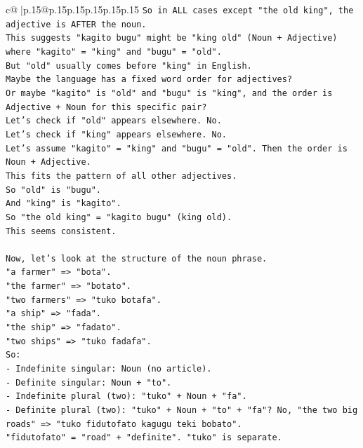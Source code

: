 \documentclass{article}
\begin{document}
{\begin{supertabular}{c@{$\;$}|p{.15\linewidth}@{}p{.15\linewidth}p{.15\linewidth}p{.15\linewidth}p{.15\linewidth}p{.15\linewidth}}
{{{\texttt{So in ALL cases except "the old king", the adjective is AFTER the noun.} \\
\texttt{This suggests "kagito bugu" might be "king old" (Noun + Adjective) where "kagito" = "king" and "bugu" = "old".} \\
\texttt{But "old" usually comes before "king" in English.} \\
\texttt{Maybe the language has a fixed word order for adjectives?} \\
\texttt{Or maybe "kagito" is "old" and "bugu" is "king", and the order is Adjective + Noun for this specific pair?} \\
\texttt{Let's check if "old" appears elsewhere. No.} \\
\texttt{Let's check if "king" appears elsewhere. No.} \\
\texttt{Let's assume "kagito" = "king" and "bugu" = "old". Then the order is Noun + Adjective.} \\
\texttt{This fits the pattern of all other adjectives.} \\
\texttt{So "old" is "bugu".} \\
\texttt{And "king" is "kagito".} \\
\texttt{So "the old king" = "kagito bugu" (king old).} \\
\texttt{This seems consistent.} \\
\\ 
\texttt{Now, let's look at the structure of the noun phrase.} \\
\texttt{"a farmer" => "bota".} \\
\texttt{"the farmer" => "botato".} \\
\texttt{"two farmers" => "tuko botafa".} \\
\texttt{"a ship" => "fada".} \\
\texttt{"the ship" => "fadato".} \\
\texttt{"two ships" => "tuko fadafa".} \\
\texttt{So:} \\
\texttt{{-} Indefinite singular: Noun (no article).} \\
\texttt{{-} Definite singular: Noun + "to".} \\
\texttt{{-} Indefinite plural (two): "tuko" + Noun + "fa".} \\
\texttt{{-} Definite plural (two): "tuko" + Noun + "to" + "fa"? No, "the two big roads" => "tuko fidutofato kagugu teki bobato".} \\
\texttt{"fidutofato" = "road" + "definite". "tuko" is separate.} \\
}}}
\end{supertabular}}
\end{document}
